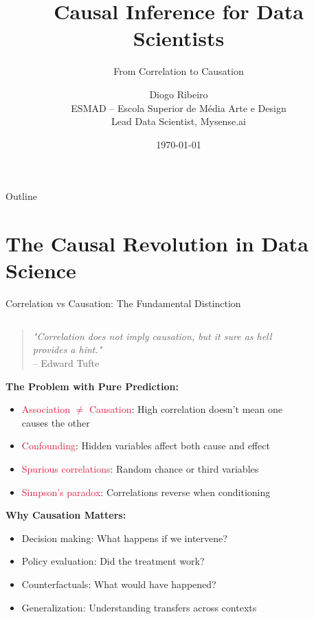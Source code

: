 \documentclass[aspectratio=169,11pt]{beamer}
\title[Causal Inference]{Causal Inference for Data Scientists}
\subtitle{From Correlation to Causation}
\author[D. Ribeiro]{Diogo Ribeiro\\
\small ESMAD -- Escola Superior de Média Arte e Design\\
\small Lead Data Scientist, Mysense.ai}
\date{\today}
\begin{document}
\begin{frame}
\titlepage
\end{frame}

\begin{frame}{Outline}
\tableofcontents
\end{frame}

\section{The Causal Revolution in Data Science}

\begin{frame}{Correlation vs Causation: The Fundamental Distinction}
\begin{columns}
\begin{column}{0.6\textwidth}
\begin{quote}
\textit{"Correlation does not imply causation, but it sure as hell provides a hint."} 
\\[0.2cm]
\hfill -- Edward Tufte
\end{quote}

\vspace{0.3cm}
\textbf{The Problem with Pure Prediction:}
\begin{itemize}
\item \textcolor{crimson}{Association $\neq$ Causation}: High correlation doesn't mean one causes the other
\item \textcolor{crimson}{Confounding}: Hidden variables affect both cause and effect
\item \textcolor{crimson}{Spurious correlations}: Random chance or third variables
\item \textcolor{crimson}{Simpson's paradox}: Correlations reverse when conditioning
\end{itemize}

\vspace{0.3cm}
\textbf{Why Causation Matters:}
\begin{itemize}
\item \textcolor{forest}{Decision making}: What happens if we intervene?
\item \textcolor{forest}{Policy evaluation}: Did the treatment work?
\item \textcolor{forest}{Counterfactuals}: What would have happened?
\item \textcolor{forest}{Generalization}: Understanding transfers across contexts
\end{itemize}
\end{column}
\begin{column}{0.4\textwidth}
\begin{figure}
\centering
{}
\end{figure}
\end{column}
\end{columns}
\end{frame}
\end{document}
